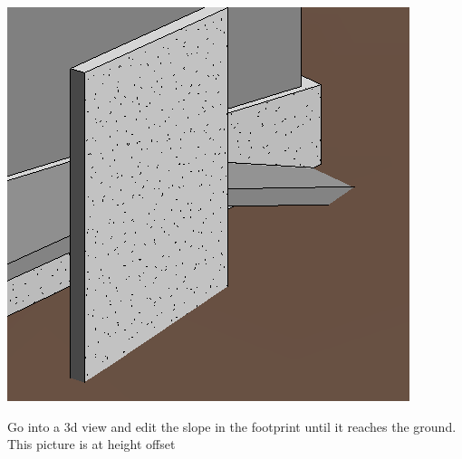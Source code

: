 \documentclass{tufte-book} %
\begin{document}
\begin{enumerate}
		\begin{marginfigure}
		\includegraphics[width=\linewidth]{revitentrydeckfinal.png}
		\caption[A Sloped Deck]{Go into a 3d view and edit the slope in the footprint until it reaches the ground. This picture is at  height offset}
		\end{marginfigure}
\end{enumerate}
	
	
		


	


\backmatter




\printindex %
\end{document}
